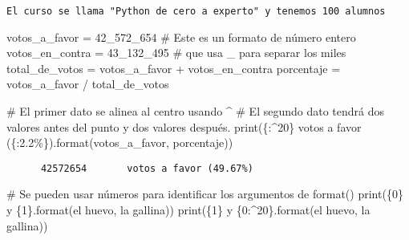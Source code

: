 \documentclass[
  letterpaper,
  DIV=11,
  numbers=noendperiod]{scrreprt}
\newenvironment{Shaded}{\begin{snugshade}}{\end{snugshade}}
\newcommand{\BuiltInTok}[1]{\textcolor[rgb]{0.00,0.23,0.31}{#1}}
\newcommand{\CommentTok}[1]{\textcolor[rgb]{0.37,0.37,0.37}{#1}}
\newcommand{\DecValTok}[1]{\textcolor[rgb]{0.68,0.00,0.00}{#1}}
\newcommand{\NormalTok}[1]{\textcolor[rgb]{0.00,0.23,0.31}{#1}}
\newcommand{\OperatorTok}[1]{\textcolor[rgb]{0.37,0.37,0.37}{#1}}
\newcommand{\SpecialCharTok}[1]{\textcolor[rgb]{0.37,0.37,0.37}{#1}}
\newcommand{\StringTok}[1]{\textcolor[rgb]{0.13,0.47,0.30}{#1}}
\begin{document}
\begin{verbatim}
El curso se llama "Python de cero a experto" y tenemos 100 alumnos
\end{verbatim}

\begin{Shaded}
\begin{Highlighting}[]
\NormalTok{votos\_a\_favor }\OperatorTok{=} \DecValTok{42\_572\_654}   \CommentTok{\# Este es un formato de número entero}
\NormalTok{votos\_en\_contra }\OperatorTok{=} \DecValTok{43\_132\_495} \CommentTok{\# que usa \_ para separar los miles}
\NormalTok{total\_de\_votos }\OperatorTok{=}\NormalTok{ votos\_a\_favor }\OperatorTok{+}\NormalTok{ votos\_en\_contra}
\NormalTok{porcentaje }\OperatorTok{=}\NormalTok{ votos\_a\_favor }\OperatorTok{/}\NormalTok{ total\_de\_votos}

\CommentTok{\# El primer dato se alinea al centro usando \^{}}
\CommentTok{\# El segundo dato tendrá dos valores antes del punto y dos valores después.}
\BuiltInTok{print}\NormalTok{(}\StringTok{\textquotesingle{}}\SpecialCharTok{\{:\^{}20\}}\StringTok{ votos a favor (}\SpecialCharTok{\{:2.2\%\}}\StringTok{)\textquotesingle{}}\NormalTok{.}\BuiltInTok{format}\NormalTok{(votos\_a\_favor, porcentaje))}
\end{Highlighting}
\end{Shaded}

\begin{verbatim}
      42572654       votos a favor (49.67%)
\end{verbatim}

\begin{Shaded}
\begin{Highlighting}[]
\CommentTok{\# Se pueden usar números para identificar los argumentos de format()}
\BuiltInTok{print}\NormalTok{(}\StringTok{\textquotesingle{}}\SpecialCharTok{\{0\}}\StringTok{ y }\SpecialCharTok{\{1\}}\StringTok{\textquotesingle{}}\NormalTok{.}\BuiltInTok{format}\NormalTok{(}\StringTok{\textquotesingle{}el huevo\textquotesingle{}}\NormalTok{, }\StringTok{\textquotesingle{}la gallina\textquotesingle{}}\NormalTok{))}
\BuiltInTok{print}\NormalTok{(}\StringTok{\textquotesingle{}}\SpecialCharTok{\{1\}}\StringTok{ y }\SpecialCharTok{\{0:\^{}20\}}\StringTok{\textquotesingle{}}\NormalTok{.}\BuiltInTok{format}\NormalTok{(}\StringTok{\textquotesingle{}el huevo\textquotesingle{}}\NormalTok{, }\StringTok{\textquotesingle{}la gallina\textquotesingle{}}\NormalTok{))}
\end{Highlighting}
\end{Shaded}
\end{document}

